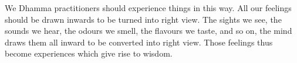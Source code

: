 We Dhamma practitioners should experience things in this way. All our feelings should be drawn inwards to be turned into right view. The sights we see, the sounds we hear, the odours we smell, the flavours we taste, and so on, the mind draws them all inward to be converted into right view. Those feelings thus become experiences which give rise to wisdom.
